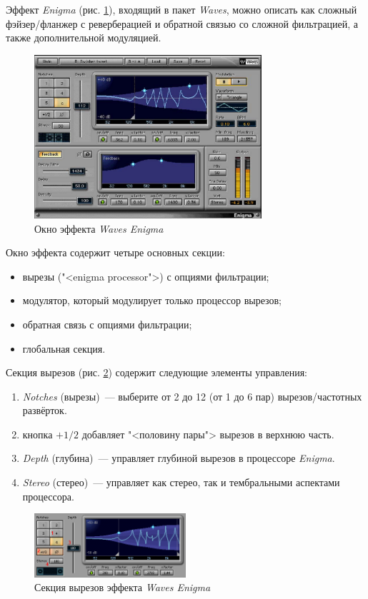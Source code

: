 \documentclass[oneside, final, 14pt]{extreport}
\begin{document}
Эффект \emph{Enigma} (рис. \ref{pic-enigma-01}), входящий в пакет \emph{Waves}, можно описать как сложный фэйзер/фланжер с реверберацией и обратной связью со сложной фильтрацией, а также дополнительной модуляцией.

\begin{figure}[h!]
  \centering
  \includegraphics[width=0.75\textwidth]{pic-enigma-01}
  \caption{Окно эффекта \emph{Waves Enigma}}
  \label{pic-enigma-01}
\end{figure}

Окно эффекта содержит четыре основных секции:
\begin{itemize}
  \item вырезы ("<enigma processor">) с опциями фильтрации;
  \item модулятор, который модулирует только процессор вырезов;
  \item обратная связь с опциями фильтрации;
  \item глобальная секция.
\end{itemize}

Секция вырезов (рис. \ref{pic-enigma-02}) содержит следующие элементы управления:
\begin{enumerate}
  \item \emph{Notches} (вырезы)~--- выберите от 2 до 12 (от 1 до 6 пар) вырезов/частотных развёрток.
  \item кнопка $+1/2$ добавляет "<половину пары"> вырезов в верхнюю часть.
  \item \emph{Depth} (глубина)~--- управляет глубиной вырезов в процессоре \emph{Enigma}.
  \item \emph{Stereo} (стерео)~--- управляет как стерео, так и тембральными аспектами процессора.
\end{enumerate}

\begin{figure}[h!]
  \centering
  \includegraphics[width=0.5\textwidth]{pic-enigma-02}
  \caption{Секция вырезов эффекта \emph{Waves Enigma}}
  \label{pic-enigma-02}
\end{figure}
\end{document}
